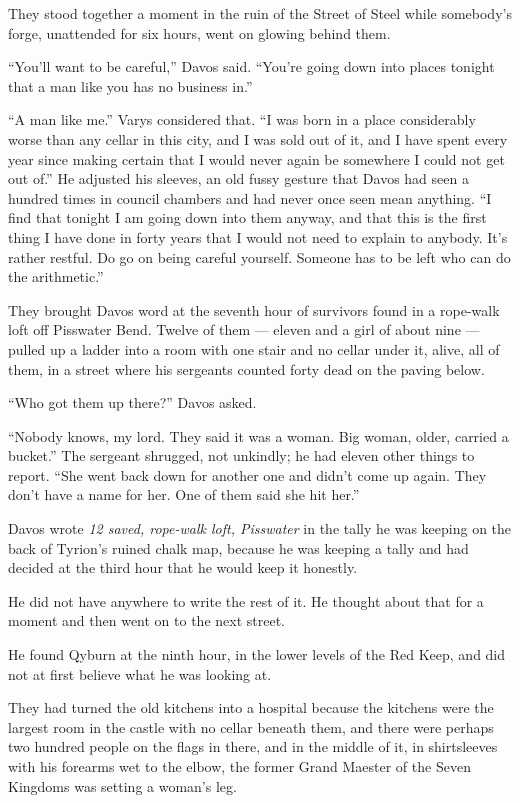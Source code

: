 They stood together a moment in the ruin of the Street of Steel while somebody’s forge, unattended for six hours, went on glowing behind them.

“You’ll want to be careful,” Davos said. “You’re going down into places tonight that a man like you has no business in.”

“A man like me.” Varys considered that. “I was born in a place considerably worse than any cellar in this city, and I was sold out of it, and I have spent every year since making certain that I would never again be somewhere I could not get out of.” He adjusted his sleeves, an old fussy gesture that Davos had seen a hundred times in council chambers and had never once seen mean anything. “I find that tonight I am going down into them anyway, and that this is the first thing I have done in forty years that I would not need to explain to anybody. It’s rather restful. Do go on being careful yourself. Someone has to be left who can do the arithmetic.”

\sceneBreak

They brought Davos word at the seventh hour of survivors found in a rope-walk loft off Pisswater Bend. Twelve of them — eleven and a girl of about nine — pulled up a ladder into a room with one stair and no cellar under it, alive, all of them, in a street where his sergeants counted forty dead on the paving below.

“Who got them up there?” Davos asked.

“Nobody knows, my lord. They said it was a woman. Big woman, older, carried a bucket.” The sergeant shrugged, not unkindly; he had eleven other things to report. “She went back down for another one and didn’t come up again. They don’t have a name for her. One of them said she hit her.”

Davos wrote \textit{12 saved, rope-walk loft, Pisswater} in the tally he was keeping on the back of Tyrion’s ruined chalk map, because he was keeping a tally and had decided at the third hour that he would keep it honestly.

He did not have anywhere to write the rest of it. He thought about that for a moment and then went on to the next street.

\sceneBreak

He found Qyburn at the ninth hour, in the lower levels of the Red Keep, and did not at first believe what he was looking at.

They had turned the old kitchens into a hospital because the kitchens were the largest room in the castle with no cellar beneath them, and there were perhaps two hundred people on the flags in there, and in the middle of it, in shirtsleeves with his forearms wet to the elbow, the former Grand Maester of the Seven Kingdoms was setting a woman’s leg.

